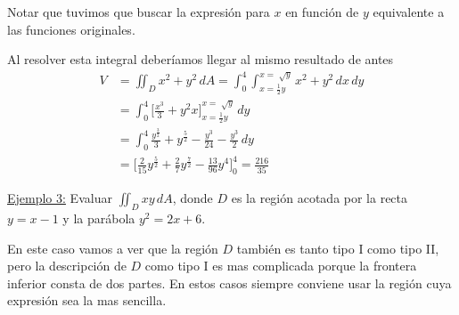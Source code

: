\documentclass[12pt]{article}
\begin{document}
Notar que tuvimos que buscar la expresión para $ x $ en función de $ y $ equivalente a las funciones originales.

Al resolver esta integral deberíamos llegar al mismo resultado de antes
\begin{align*}
  V &= \iint_{D} x^2+y^2 \,dA = \int_{0}^{4} \int_{x=\frac{1}{2}y}^{x=\sqrt[]{y}} x^2+y^2 \,dx\,dy\\
   &= \int_{0}^{4} \Bigg[\frac{x^3}{3}+y^2x\Bigg]_{x=\frac{1}{2}y}^{x=\sqrt[]{y}} \,dy\\
   &= \int_{0}^{4} \frac{y^{\frac{3}{2}}}{3}+y^{\frac{5}{2}}-\frac{y^3}{24}-\frac{y^3}{2} \,dy\\
   &= \Bigg[\frac{2}{15}y^\frac{5}{2}+\frac{2}{7}y^\frac{7}{2}-\frac{13}{96}y^4\Bigg]_{0}^{4} = \frac{216}{35}
\end{align*}

\underline{Ejemplo 3:} Evaluar $ \iint_{D} xy \,dA $, donde $ D $ es la región acotada por la recta $ y=x-1 $ y la parábola $ y^2=2x+6 $.

En este caso vamos a ver que la región $ D $ también es tanto tipo I como tipo II, pero la descripción de $ D $ como tipo I es mas complicada porque la frontera inferior consta de dos partes. En estos casos siempre conviene usar la región cuya expresión sea la mas sencilla.
\end{document}
